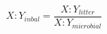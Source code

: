 \documentclass[authoryear,preprint,review,12pt]{elsarticle}
\begin{document}
                                                                                                                                                                                                                                                                                                                                                                                                                                                                                                                                                                                                                                                                                                                                                                                                                                                                                                                                                                                                                                                                                                                              \begin{equation}
                                                                                                                                                                                                                                                                                                                                                                                                                                                                                                                                                                                                                                                                                                                                                                                                                                                                                                                                                                                                                                                                                                                              X:Y_{inbal}=\frac{X:Y_{litter}}{X:Y_{microbial}} \label{eq:resp.acc}

\end{equation}
\end{document}
